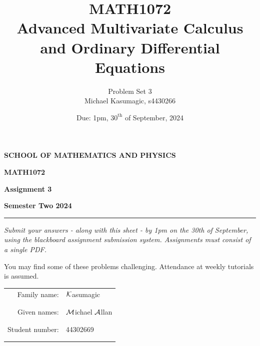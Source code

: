 \documentclass[a4paper, 11pt]{report}
\title{\Huge{MATH1072}\\Advanced Multivariate Calculus and Ordinary Differential Equations}
\author{\huge{Problem Set 3}\\\huge{Michael Kasumagic, s4430266}}
\date{\huge{Due: 1pm, $30^\text{th}$ of September, 2024}}
\begin{document}
\begin{center}
{\bf SCHOOL OF MATHEMATICS AND PHYSICS}
\end{center}
\centerline{\large\bf MATH1072}
\vspace{.1cm}   
\centerline{\large\bf Assignment 3}
\vspace{.1cm}
\centerline{\large\bf Semester Two 2024}

\vspace{3mm}
\hrule
\vspace{3mm}

{\it Submit your answers - along with this sheet - by 1pm on the 30th of September, using the blackboard assignment submission system. Assignments must consist of a single PDF.
}

You may find some of these problems challenging. Attendance at weekly tutorials is assumed.

\vspace{1cm}

\begin{tabular}{rl}
	Family name: & $\mathcal{K}$asumagic \\
	& \\
	& \\
	Given names: & $\mathcal{M}$ichael $\mathcal{A}$llan \\
	& \\
	& \\
	Student number: & 44302669 \\
	& \\
	& \\
\end{tabular}
\end{document}
